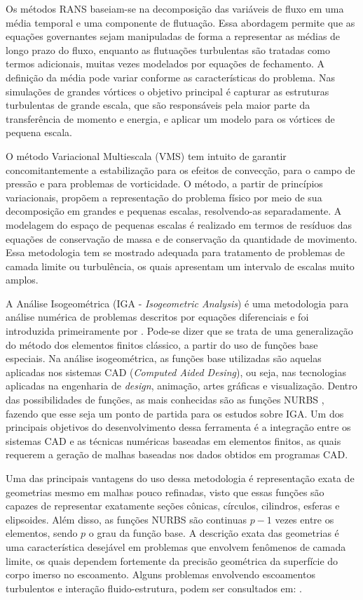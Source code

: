 \documentclass[tese_patricia.tex]{subfiles}
\begin{document}
Os métodos RANS baseiam-se na decomposição das variáveis de fluxo em uma média temporal e uma componente de flutuação. Essa abordagem permite que as equações governantes sejam manipuladas de forma a representar as médias de longo prazo do fluxo, enquanto as flutuações turbulentas são tratadas como termos adicionais, muitas vezes modelados por equações de fechamento. A definição da média pode variar conforme as características do problema. Nas simulações de grandes vórtices o objetivo principal é capturar as estruturas turbulentas de grande escala, que são responsáveis pela maior parte da transferência de momento e energia, e aplicar um modelo para os vórtices de pequena escala. 

O método Variacional Multiescala (VMS) \cite{Hughes:1995,Hughesetal:1998,Hughesetal:2001,BazilevsTT:2013} tem intuito de garantir concomitantemente a estabilização para os efeitos de convecção, para o campo de pressão e para problemas de vorticidade. O método, a partir de princípios variacionais, propõem a representação do problema físico por meio de sua decomposição em grandes e pequenas escalas, resolvendo-as separadamente.  A modelagem do espaço de pequenas escalas é realizado em termos de resíduos das equações de conservação de massa e de conservação da quantidade de movimento. Essa metodologia tem se mostrado adequada para tratamento de problemas de camada limite ou turbulência, os quais apresentam um intervalo de escalas muito amplos.

A Análise Isogeométrica (IGA - \textit{Isogeometric Analysis}) é uma metodologia para análise numérica de problemas descritos por equações diferenciais e foi introduzida primeiramente por . Pode-se dizer que se trata de uma generalização do método dos elementos finitos clássico, a partir do uso de funções base especiais. Na análise isogeométrica, as funções base utilizadas são aquelas aplicadas nos sistemas CAD (\textit{Computed Aided Desing}), ou seja, nas tecnologias aplicadas na engenharia de \textit{design}, animação, artes gráficas e visualização.  Dentro das possibilidades de funções, as mais conhecidas são as funções NURBS \cite{PiegT:1996}, fazendo que esse seja um ponto de partida para os estudos sobre IGA. Um dos principais objetivos do desenvolvimento dessa ferramenta é a integração entre os sistemas CAD e as técnicas numéricas baseadas em elementos finitos, as quais requerem a geração de malhas baseadas nos dados obtidos em programas CAD. 

Uma das principais vantagens do uso dessa metodologia é representação exata de geometrias mesmo em malhas pouco refinadas, visto que essas funções são capazes de representar exatamente seções cônicas, círculos, cilindros, esferas e elipsoides. Além disso, as funções NURBS são continuas $p-1$ vezes entre os elementos, sendo $p$ o grau da função base. A descrição exata das geometrias é uma característica desejável em problemas que envolvem fenômenos de camada limite, os quais dependem fortemente da precisão geométrica da superfície do corpo imerso no escoamento. Alguns problemas envolvendo escoamentos turbulentos e interação fluido-estrutura, podem ser consultados em: .
\end{document}

